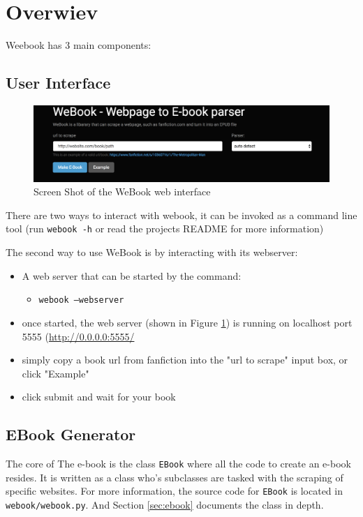 \documentclass[]{report}   %
\begin{document}
\section{Overwiev}
Weebook has 3 main components:
\subsection{User Interface}
\begin{figure}[h]
    \includegraphics[width=\textwidth]{img/webook_web.png}
    \caption{Screen Shot of the WeBook web interface}
    \label{fig:webook-web}
\end{figure}

There are two ways to interact with webook, it can be invoked as a command line tool (run \texttt{webook -h} or read the projects README for more information)

The second way to use WeBook is by interacting with its webserver:
\begin{itemize}
    \item A web server that can be started by the command:
    \begin{itemize}
        \item \texttt{webook --webserver}
    \end{itemize}
    \item once started, the web server (shown in Figure \ref{fig:webook-web})
        is running on localhost port 5555 (\url{http://0.0.0.0:5555/}
    \item simply copy a book url from fanfiction into the "url to scrape" input box, or click "Example"
    \item click submit and wait for your book
\end{itemize}

\subsection{EBook Generator}
The core of The e-book is the class \texttt{EBook} where all the code to create
an e-book resides. It is written as a class who's subclasses are tasked with
the scraping of specific websites. For more information, the source code for
\texttt{EBook} is located in \texttt{webook/webook.py}. And Section
\ref{sec:ebook} documents the class in depth.
\end{document}
